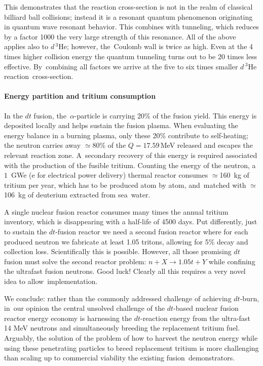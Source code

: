 \documentclass[particles,article,accept,pdftex,moreauthors]{Definitions/mdpi}
\begin{document}
This demonstrates that the reaction cross-section is not in the realm of classical billiard ball collisions; instead it is a resonant quantum phenomenon originating in quantum wave resonant behavior. This combines with tunneling, which reduces by a factor 1000 the very large strength of this resonance. All of the above applies also to $d\,{}^{3\!}\mathrm{He}$; however, the~Coulomb wall is twice as high. Even at the 4 times higher collision energy the quantum tunneling turns out to be 20 times less effective. By~combining all factors we arrive at the five to six times smaller $d\,{}^{3}\mathrm{He}$ reaction~cross-section.

\vspace{-6pt}\paragraph*{\bf Energy partition and tritium consumption}
In the $dt$ fusion, the~$\alpha$-particle is carrying 20\% of the fusion yield. This energy is deposited locally and helps sustain the fusion plasma. When evaluating the energy balance in a burning plasma, only these 20\% contribute to self-heating; the neutron carries away $\simeq$80\% of the $Q=17.59$\,MeV released and escapes the relevant reaction zone. A~secondary recovery of this energy is required associated with the production of the fusible tritium. Counting the energy of the neutron, a~$1$~GWe (e for electrical power delivery) thermal reactor consumes $\simeq$160~kg of tritium per year, which has to be produced atom by atom, and~matched with $\simeq$106~kg of deuterium extracted from sea~water. 

A single nuclear fusion reactor consumes many times the annual tritium inventory, which is disappearing with a half-life of 4500 days. Put differently, just to sustain the $dt$-fusion reactor we need a second fusion reactor where for each produced neutron we fabricate at least 1.05 tritons, allowing for 5\% decay and collection loss. Scientifically this is possible. However, all those promising $dt$ fusion must solve the second reactor problem: $n+X\to 1.05 t+Y$ while confining the ultrafast fusion neutrons. Good luck! Clearly all this requires a very novel idea to allow~implementation.

We conclude: rather than the commonly addressed challenge of achieving $dt$-burn, in~our opinion the central unsolved challenge of the $dt$-based nuclear fusion reactor energy economy is harnessing the $dt$-reaction energy from the ultra-fast 14 MeV neutrons and simultaneously breeding the replacement tritium fuel. Arguably, the solution of the problem of how to harvest the neutron energy while using these penetrating particles to breed replacement tritium is more challenging than scaling up to commercial viability the existing fusion~demonstrators.
\end{document}
